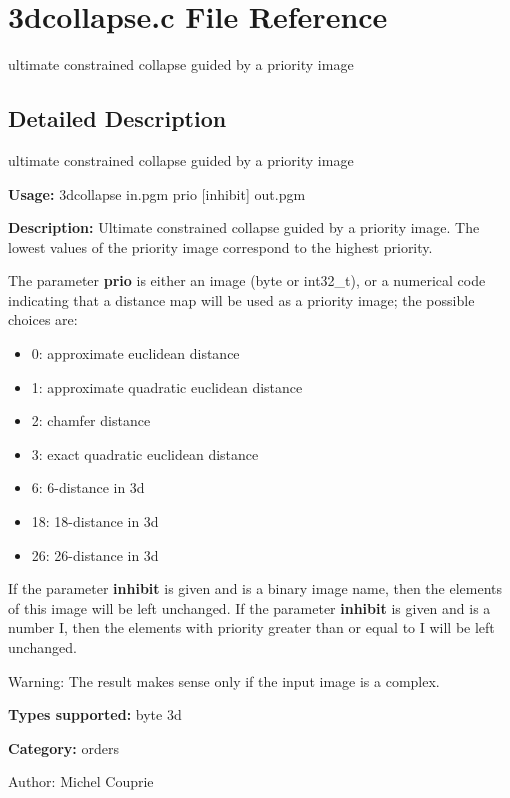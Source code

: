\section{3dcollapse.c File Reference}
\label{3dcollapse_8c}
ultimate constrained collapse guided by a priority image 



\subsection{Detailed Description}
ultimate constrained collapse guided by a priority image 

{\bf Usage:} 3dcollapse in.pgm prio [inhibit] out.pgm

{\bf Description:} Ultimate constrained collapse guided by a priority image. The lowest values of the priority image correspond to the highest priority.

The parameter {\bf prio} is either an image (byte or int32\_\-t), or a numerical code indicating that a distance map will be used as a priority image; the possible choices are: \begin{itemize}
\item 0: approximate euclidean distance \item 1: approximate quadratic euclidean distance \item 2: chamfer distance \item 3: exact quadratic euclidean distance \item 6: 6-distance in 3d \item 18: 18-distance in 3d \item 26: 26-distance in 3d\end{itemize}
If the parameter {\bf inhibit} is given and is a binary image name, then the elements of this image will be left unchanged. If the parameter {\bf inhibit} is given and is a number I, then the elements with priority greater than or equal to I will be left unchanged.

\begin{Desc}
\item[Warning:]The result makes sense only if the input image is a complex.\end{Desc}
{\bf Types supported:} byte 3d

{\bf Category:} orders

\begin{Desc}
\item[Author:]Michel Couprie \end{Desc}
